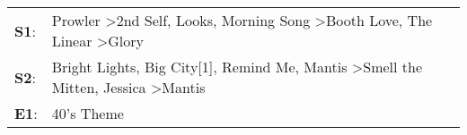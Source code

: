 \begin{supertabular}{p{0.03\textwidth}p{0.92\textwidth}}
 \textbf{S1}:  &  Prowler\textsuperscript{} \textgreater \enspace 2nd Self\textsuperscript{}, \enspace Looks\textsuperscript{}, \enspace Morning Song\textsuperscript{} \textgreater \enspace Booth Love\textsuperscript{}, \enspace The Linear\textsuperscript{} \textgreater \enspace Glory\textsuperscript{}  \enspace  \\
 \textbf{S2}:  &                              Bright Lights, Big City[1]\textsuperscript{}, \enspace Remind Me\textsuperscript{}, \enspace Mantis\textsuperscript{} \textgreater \enspace Smell the Mitten\textsuperscript{}, \enspace Jessica\textsuperscript{} \textgreater \enspace Mantis\textsuperscript{}  \enspace  \\
 \textbf{E1}:  &                                                                                                                                                                                                                                                                   40's Theme\textsuperscript{}  \enspace  \\
\end{supertabular}

